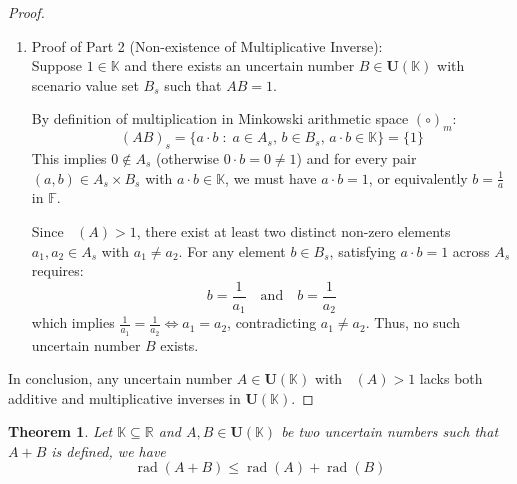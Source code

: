 \documentclass[a4paper,12pt,twoside]{memoir}
\newtheorem{theorem}{Theorem}[chapter]
\DeclareMathOperator{\dimU}{\dim_U}
\DeclareMathOperator{\rad}{rad}
\newcommand{\tsbd}[1]{\mathbf{U}(\mathbb{#1})}
\begin{document}
\begin{proof}
\begin{enumerate}[leftmargin=*]
			\item Proof of Part 2 (Non-existence of Multiplicative Inverse): \\
			Suppose $1 \in \mathbb{K}$ and there exists an uncertain number $B \in \tsbd{K}$ with scenario value set $B_s$ such that $AB = 1$.
			
			By definition of multiplication in Minkowski arithmetic space $(\circ)_m$:
			\[
			(AB)_s = \{a \cdot b \;:\; a \in A_s, \, b \in B_s, \, a \cdot b \in \mathbb{K}\} = \{1\}
			\]
			This implies $0 \notin A_s$ (otherwise $0 \cdot b = 0 \neq 1$) and for every pair $(a, b) \in A_s \times B_s$ with $a \cdot b \in \mathbb{K}$, we must have $a \cdot b = 1$, or equivalently $b = \frac{1}{a}$ in $\mathbb{F}$.
			
			Since $\dimU(A) > 1$, there exist at least two distinct non-zero elements $a_1, a_2 \in A_s$ with $a_1 \neq a_2$.
			For any element $b \in B_s$, satisfying $a \cdot b = 1$ across $A_s$ requires:
			\[
			b = \frac{1}{a_1} \quad \text{and} \quad b = \frac{1}{a_2}
			\]
			which implies $\frac{1}{a_1} = \frac{1}{a_2} \iff a_1 = a_2$, contradicting $a_1 \neq a_2$. Thus, no such uncertain number $B$ exists.
		\end{enumerate}
		
		In conclusion, any uncertain number $A \in \tsbd{K}$ with $\dimU(A) > 1$ lacks both additive and multiplicative inverses in $\tsbd{K}$.
	\end{proof}
	\begin{theorem}
		Let $\mathbb{K} \subseteq \mathbb{R}$ and $A, B \in \tsbd{K}$ be two uncertain numbers such that $A + B$ is defined, we have
		$$\rad(A+B) \leq \rad(A) +\rad(B)$$
	\end{theorem}
\end{document}
